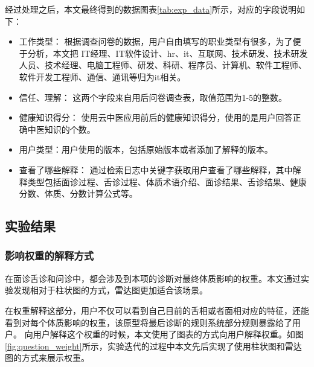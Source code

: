 经过处理之后，本文最终得到的数据图表\ref{tab:exp_data}所示，对应的字段说明如下：
\begin{itemize}
  \item 工作类型： 根据调查问卷的数据，用户自由填写的职业类型有很多，为了便于分析，本文把 IT经理、IT软件设计、hr、it、互联网、技术研发、技术研发人员、技术经理、电脑工程师、研发、科研、程序员、计算机、软件工程师、软件开发工程师、通信、通讯等归为it相关。

  \item  信任、理解： 这两个字段来自用后问卷调查表，取值范围为1-5的整数。

  \item  健康知识得分： 使用云中医应用前后的健康知识得分，使用的是用户回答正确中医知识的个数。

  \item  用户类型：用户使用的版本，包括原始版本或者添加了解释的版本。

  \item  查看了哪些解释： 通过检索日志中关键字获取用户查看了哪些解释，其中解释类型包括面诊过程、舌诊过程、体质术语介绍、面诊结果、舌诊结果、健康分数、体质、分数计算公式等。
\end{itemize}

\subsection{实验结果}

\subsubsection{影响权重的解释方式}
在面诊舌诊和问诊中，都会涉及到本项的诊断对最终体质影响的权重。本文通过实验发现相对于柱状图的方式，雷达图更加适合该场景。

在权重解释这部分，用户不仅可以看到自己目前的舌相或者面相对应的特征，还能看到对每个体质影响的权重，该原型将最后诊断的规则系统部分规则暴露给了用户。
向用户解释这个权重的时候，本文使用了图表的方式向用户解释权重。如图\ref{fig:question_weight}所示，实验迭代的过程中本文先后实现了使用柱状图和雷达图的方式来展示权重。

